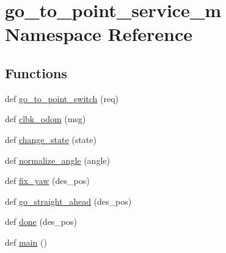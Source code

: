 \hypertarget{namespacego__to__point__service__m}{}\section{go\+\_\+to\+\_\+point\+\_\+service\+\_\+m Namespace Reference}
\label{namespacego__to__point__service__m}
\subsection*{Functions}
\begin{DoxyCompactItemize}
\item 
def \hyperlink{namespacego__to__point__service__m_a5aa5049687ed47c4e5e85903267700ee}{go\+\_\+to\+\_\+point\+\_\+switch} (req)
\item 
def \hyperlink{namespacego__to__point__service__m_a379907ef466483603becace59e6f973b}{clbk\+\_\+odom} (msg)
\item 
def \hyperlink{namespacego__to__point__service__m_a40af22e9a0b3ac0544d0c08b246e6436}{change\+\_\+state} (state)
\item 
def \hyperlink{namespacego__to__point__service__m_a9016b8d25737fe805f75d9db52ff4680}{normalize\+\_\+angle} (angle)
\item 
def \hyperlink{namespacego__to__point__service__m_a45b937484f29d60d6578dd670f07f241}{fix\+\_\+yaw} (des\+\_\+pos)
\item 
def \hyperlink{namespacego__to__point__service__m_aa0efa6e8f30a39de9a6440888882daf1}{go\+\_\+straight\+\_\+ahead} (des\+\_\+pos)
\item 
def \hyperlink{namespacego__to__point__service__m_a22f1876bd87959557a463d43fa521ad3}{done} (des\+\_\+pos)
\item 
def \hyperlink{namespacego__to__point__service__m_a294bca40052b9b1c83ddf85a023b276e}{main} ()
\end{DoxyCompactItemize}
